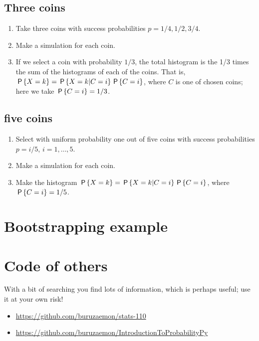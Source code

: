 \documentclass[a4paper]{article}
\begin{document}
\subsection{Three coins}
\label{sec:orga657159}
\begin{enumerate}
\item Take three coins with success probabilities \(p=1/4, 1/2, 3/4\).
\item Make a simulation for each coin.
\item If we select a coin with probability \(1/3\), the total histogram is the 1/3 times the sum of the histograms of each of the coins. That is, \(\P{X=k} = \P{X=k|C = i}\P{C=i}\), where \(C\) is one of chosen coins;  here we take \(\P{C=i} = 1/3\).
\end{enumerate}

\subsection{five coins}
\label{sec:orga1a3b28}
\begin{enumerate}
\item Select with uniform probability one out of five coins with success probabilities \(p=i/5\),  \(i=1,\ldots, 5\).
\item Make a simulation for each coin.
\item Make the histogram \(\P{X=k} = \P{X=k|C = i}\P{C=i}\), where \(\P{C=i} = 1/5\).
\end{enumerate}

\section{Bootstrapping example}
\label{sec:org6006a3a}

\section{Code of others}
\label{sec:org9764e8d}

With a bit of searching you find lots of information, which is perhaps  useful;  use it at your own risk!

\begin{itemize}
\item \url{https://github.com/buruzaemon/stats-110}
\item \url{https://github.com/buruzaemon/IntroductionToProbabilityPy}
\end{itemize}
\end{document}

